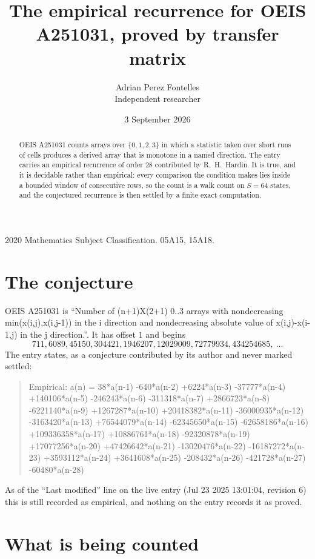 \documentclass[11pt,a4paper]{article}
\title{The empirical recurrence for OEIS A251031, proved by transfer matrix}
\author{Adrian Perez Fontelles\\ \small Independent researcher}
\date{3 September 2026}
\theoremstyle{plain}
\theoremstyle{definition}
\begin{document}
\maketitle

\begin{abstract}
OEIS A251031 counts arrays over $\{0,1,2,3\}$ in which a statistic taken over short runs
of cells produces a derived array that is monotone in a named direction. The entry carries an
empirical recurrence of order $28$ contributed by R.~H.~Hardin. It is true, and it is
decidable rather than empirical: every comparison the condition makes lies inside a bounded
window of consecutive rows, so the count is a walk count on $S=64$ states, and the
conjectured recurrence is then settled by a finite exact computation.
\end{abstract}

\noindent\small 2020 Mathematics Subject Classification. 05A15, 15A18.\normalsize

\section{The conjecture}

OEIS A251031 is ``Number of (n+1)X(2+1) 0..3 arrays with nondecreasing min(x(i,j),x(i,j-1)) in the i direction and nondecreasing absolute value of x(i,j)-x(i-1,j) in the j direction.''. It has offset $1$ and begins
\[
711, 6089, 45150, 304421, 1946207, 12029009, 72779934, 434254685,\ \dots
\]
The entry states, as a conjecture contributed by its author and never marked settled:
\begin{quote}
Empirical: a(n) = 38*a(n-1) -640*a(n-2) +6224*a(n-3) -37777*a(n-4) +140106*a(n-5) -246243*a(n-6) -311318*a(n-7) +2866723*a(n-8) -6221140*a(n-9) +1267287*a(n-10) +20418382*a(n-11) -36000935*a(n-12) -3163420*a(n-13) +76544079*a(n-14) -62345650*a(n-15) -62658186*a(n-16) +109336358*a(n-17) +10886761*a(n-18) -92320878*a(n-19) +17077256*a(n-20) +47426642*a(n-21) -13020476*a(n-22) -16187272*a(n-23) +3593112*a(n-24) +3641608*a(n-25) -208432*a(n-26) -421728*a(n-27) -60480*a(n-28)
\end{quote}
As of the ``Last modified'' line on the live entry (Jul 23 2025 13:01:04, revision 6) this is still
recorded as empirical, and nothing on the entry records it as proved.

\section{What is being counted}
\end{document}
